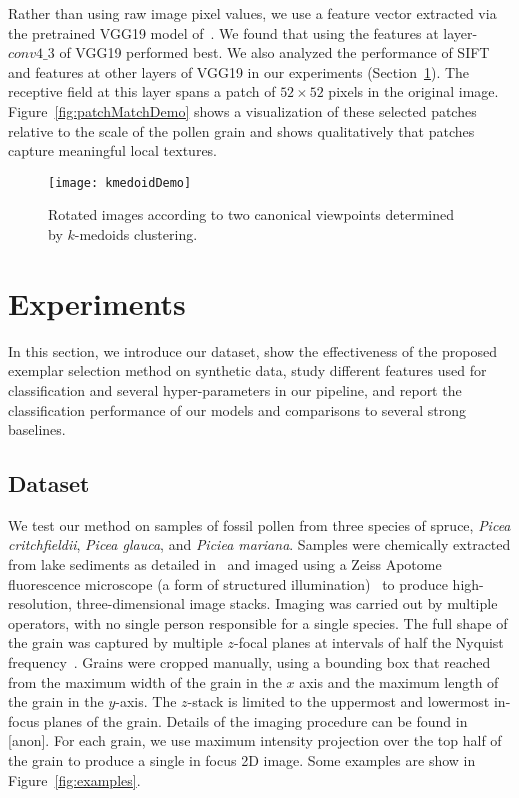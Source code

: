 \documentclass[10pt,twocolumn,letterpaper]{article}
\begin{document}
Rather than using raw image pixel values, we use a feature vector extracted via
the pretrained VGG19 model of~\cite{simonyan2014very}.  We found that using the
features at layer-$conv4\_3$ of VGG19 performed best.  We also analyzed the
performance of SIFT and features at other layers of VGG19 in our experiments
(Section~\ref{sec:exp}).  The receptive field at this layer spans a patch of
$52\times 52$ pixels in the original image.  Figure~\ref{fig:patchMatchDemo}
shows a visualization of these selected patches relative to the scale of the
pollen grain and shows qualitatively that patches capture meaningful local
textures.

\begin{figure}[t]
\centering
   \texttt{[image: kmedoidDemo]}
\vspace{-1mm}
   \caption{Rotated images according to two canonical viewpoints determined by $k$-medoids clustering.
   }
\label{fig:kmedoidDemo}
\vspace{-5mm}
\end{figure}


\section{Experiments}
\label{sec:exp}
In this section, we introduce our dataset, show the effectiveness of the
proposed exemplar selection method on synthetic data, study different features
used for classification and several hyper-parameters in our pipeline, and
report the classification performance of our models and comparisons to several
strong baselines.

\subsection{Dataset}

We test our method on samples of fossil pollen from three species of spruce,
\emph{Picea critchfieldii}, \emph{Picea glauca}, and \emph{Piciea mariana}.
Samples were chemically extracted from lake sediments as detailed in~\cite{punyasena2012classifying,mander2014identifying}
and imaged using a Zeiss Apotome fluorescence microscope (a form of
structured illumination)~\cite{weigel2009resolution} to produce
high-resolution, three-dimensional image stacks.
Imaging was carried out by multiple operators, with no single person responsible for a single species.
The full shape of the grain was captured by multiple $z$-focal planes at intervals of half the Nyquist frequency~\cite{punyasena2012classifying}.
Grains were cropped manually, using a bounding box that reached from the
maximum width of the grain in the $x$ axis and the maximum length of the grain
in the $y$-axis. The $z$-stack is limited to the uppermost and lowermost
in-focus planes of the grain.
Details of the imaging procedure can be found in [anon].
For each grain, we use maximum intensity projection over the top half of the
grain to produce a single in focus 2D image.  Some examples are show in
Figure~\ref{fig:examples}.
\end{document}
